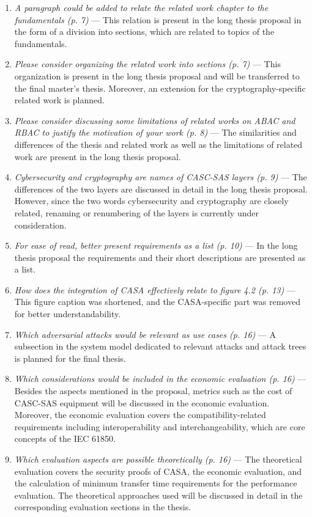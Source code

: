 \begin{enumerate}[label=R\arabic*.]
\begin{enumerate}[label=Q\arabic*.]
        \item \textit{A paragraph could be added to relate the related work chapter to the fundamentals (p. 7)} --- This relation is present in the long thesis proposal in the form of a division into sections, which are related to topics of the fundamentals.
        \item \textit{Please consider organizing the related work into sections (p. 7)} --- This organization is present in the long thesis proposal and will be transferred to the final master's thesis. Moreover, an extension for the cryptography-specific related work is planned.
        \item \textit{Please consider discussing some limitations of related works on ABAC and RBAC to justify the motivation of your work (p. 8)} --- The similarities and differences of the thesis and related work as well as the limitations of related work are present in the long thesis proposal.
        \item \textit{Cybersecurity and cryptography are names of CASC-SAS layers (p. 9)} --- The differences of the two layers are discussed in detail in the long thesis proposal. However, since the two words cybersecurity and cryptography are closely related, renaming or renumbering of the layers is currently under consideration.
        \item \textit{For ease of read, better present requirements as a list (p. 10)} --- In the long thesis proposal the requirements and their short descriptions are presented as a list.
        \item \textit{How does the integration of CASA effectively relate to figure 4.2 (p. 13)} --- This figure caption was shortened, and the CASA-specific part was removed for better understandability.
        \item \textit{Which adversarial attacks would be relevant as use cases (p. 16)} --- A subsection in the system model dedicated to relevant attacks and attack trees is planned for the final thesis.
        \item \textit{Which considerations would be included in the economic evaluation (p. 16)} --- Besides the aspects mentioned in the proposal, metrics such as the cost of CASC-SAS equipment will be discussed in the economic evaluation. Moreover, the economic evaluation covers the compatibility-related requirements including interoperability and interchangeability, which are core concepts of the IEC 61850.
        \item \textit{Which evaluation aspects are possible theoretically (p. 16)} --- The theoretical evaluation covers the security proofs of CASA, the economic evaluation, and the calculation of minimum transfer time requirements for the performance evaluation. The theoretical approaches used will be discussed in detail in the corresponding evaluation sections in the thesis.

\end{enumerate}
\end{enumerate}
